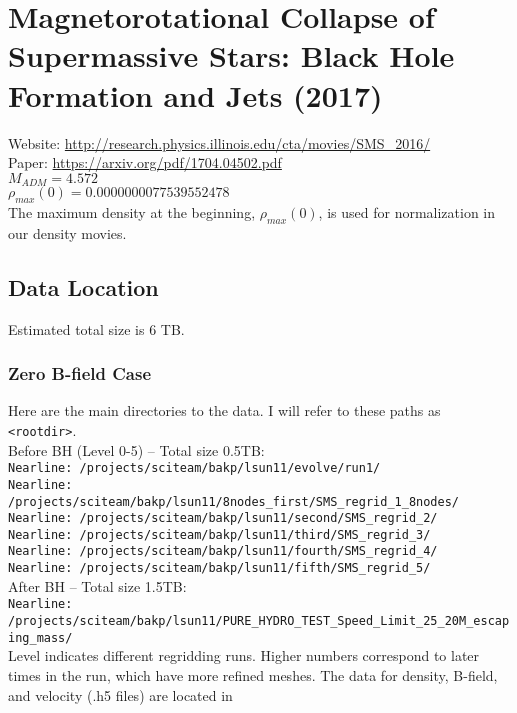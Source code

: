 \documentclass{article}
\begin{document}
\newpage
\section{Magnetorotational Collapse of Supermassive Stars: Black Hole Formation and Jets (2017)}

Website: \url{http://research.physics.illinois.edu/cta/movies/SMS_2016/} \\
Paper: \url{https://arxiv.org/pdf/1704.04502.pdf} \\
$M_{ADM} = 4.572$ \\
$\rho_{max}(0) = 0.0000000077539552478$ \\

The maximum density at the beginning, $\rho_{max}(0)$, is used for normalization in our density movies.

\subsection{Data Location}
Estimated total size is 6 TB. \\

\subsubsection{Zero B-field Case} 
Here are the main directories to the data. I will refer to these paths as \verb|<rootdir>|. \\

Before BH (Level 0-5) -- Total size 0.5TB: \\
	\verb|Nearline: /projects/sciteam/bakp/lsun11/evolve/run1/| \\
	\verb|Nearline: /projects/sciteam/bakp/lsun11/8nodes_first/SMS_regrid_1_8nodes/| \\
	\verb|Nearline: /projects/sciteam/bakp/lsun11/second/SMS_regrid_2/| \\
	\verb|Nearline: /projects/sciteam/bakp/lsun11/third/SMS_regrid_3/| \\
	\verb|Nearline: /projects/sciteam/bakp/lsun11/fourth/SMS_regrid_4/| \\
	\verb|Nearline: /projects/sciteam/bakp/lsun11/fifth/SMS_regrid_5/| \\
	
After BH -- Total size 1.5TB: \\
	\verb|Nearline: /projects/sciteam/bakp/lsun11/PURE_HYDRO_TEST_Speed_Limit_25_20M_escaping_mass/| \\

Level indicates different regridding runs. Higher numbers correspond to later times in the run, which have more refined meshes. The data for density, B-field, and velocity (.h5 files) are located in
	
\end{document}

